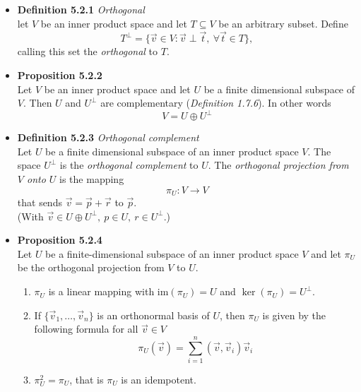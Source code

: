 \documentclass[11pt,a4paper]{article}
\begin{document}
\begin{itemize}

    \item \textbf{Definition 5.2.1} \emph{Orthogonal} \\
        let $V$ be an inner product space and let $T \subseteq V$ be an arbitrary subset.
        Define
        \[
            T^\perp = \{\vec{v} \in V : \vec{v} \perp \vec{t}, \ \forall
            \vec{t} \in T \},
        \]
        calling this set the \emph{orthogonal} to $T$.

    \item \textbf{Proposition 5.2.2} \\
        Let $V$ be an inner product space and let $U$ be a finite dimensional subspace of $V$.
        Then $U$ and $U^\perp$ are complementary (\emph{Definition 1.7.6}).
        In other words
        \[
            V = U \oplus U^\perp
        \]

    \item \textbf{Definition 5.2.3} \emph{Orthogonal complement} \\
        Let $U$ be a finite dimensional subspace of an inner product space $V$.
        The space $U^\perp$ is the \emph{orthogonal complement} to $U$.
        The \emph{orthogonal projection from $V$ onto $U$} is the mapping
        \[
            \pi_U : V \to V
        \]
        that sends $\vec{v} = \vec{p} + \vec{r}$ to $\vec{p}$. \\
        (With $\vec{v} \in U \oplus U^\perp, \ p \in U, \ r \in U^\perp$.)

    \item \textbf{Proposition 5.2.4} \\
        Let $U$ be a finite-dimensional subspace of an inner product space $V$ and let
        $\pi_U$ be the orthogonal projection from $V$ to $U$.
        \begin{enumerate}
            \item $\pi_U$ is a linear mapping with $\mathrm{im} (\pi_U) = U$ and
                $\ker(\pi_U) = U^\perp$.

            \item If $\{ \vec{v}_1, \ldots, \vec{v}_n\}$ is an orthonormal basis of $U$,
                then $\pi_U$ is given by the following formula for all $\vec{v} \in V$
                \[
                    \pi_U(\vec{v}) = \sum_{i=1}^n (\vec{v}, \vec{v}_i) \vec{v}_i
                \]
            \item $\pi_U^2 = \pi_U$, that is $\pi_U$ is an idempotent.
        \end{enumerate}


\end{itemize}
\end{document}
